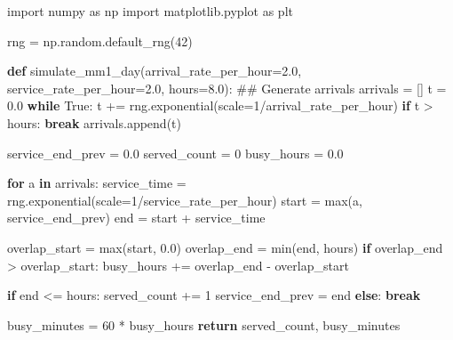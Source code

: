 \documentclass[
  letterpaper,
  DIV=11,
  numbers=noendperiod]{scrreprt}
\newenvironment{Shaded}{\begin{snugshade}}{\end{snugshade}}
\newcommand{\BuiltInTok}[1]{\textcolor[rgb]{0.00,0.23,0.31}{#1}}
\newcommand{\CommentTok}[1]{\textcolor[rgb]{0.37,0.37,0.37}{#1}}
\newcommand{\ControlFlowTok}[1]{\textcolor[rgb]{0.00,0.23,0.31}{\textbf{#1}}}
\newcommand{\DecValTok}[1]{\textcolor[rgb]{0.68,0.00,0.00}{#1}}
\newcommand{\FloatTok}[1]{\textcolor[rgb]{0.68,0.00,0.00}{#1}}
\newcommand{\ImportTok}[1]{\textcolor[rgb]{0.00,0.46,0.62}{#1}}
\newcommand{\KeywordTok}[1]{\textcolor[rgb]{0.00,0.23,0.31}{\textbf{#1}}}
\newcommand{\NormalTok}[1]{\textcolor[rgb]{0.00,0.23,0.31}{#1}}
\newcommand{\OperatorTok}[1]{\textcolor[rgb]{0.37,0.37,0.37}{#1}}
\newcommand{\VariableTok}[1]{\textcolor[rgb]{0.07,0.07,0.07}{#1}}
\begin{document}
\begin{Shaded}
\begin{Highlighting}[]
\ImportTok{import}\NormalTok{ numpy }\ImportTok{as}\NormalTok{ np}
\ImportTok{import}\NormalTok{ matplotlib.pyplot }\ImportTok{as}\NormalTok{ plt}

\NormalTok{rng }\OperatorTok{=}\NormalTok{ np.random.default\_rng(}\DecValTok{42}\NormalTok{)}

\KeywordTok{def}\NormalTok{ simulate\_mm1\_day(arrival\_rate\_per\_hour}\OperatorTok{=}\FloatTok{2.0}\NormalTok{, service\_rate\_per\_hour}\OperatorTok{=}\FloatTok{2.0}\NormalTok{, hours}\OperatorTok{=}\FloatTok{8.0}\NormalTok{):}
    \CommentTok{\#\# Generate arrivals}
\NormalTok{    arrivals }\OperatorTok{=}\NormalTok{ []}
\NormalTok{    t }\OperatorTok{=} \FloatTok{0.0}
    \ControlFlowTok{while} \VariableTok{True}\NormalTok{:}
\NormalTok{        t }\OperatorTok{+=}\NormalTok{ rng.exponential(scale}\OperatorTok{=}\DecValTok{1}\OperatorTok{/}\NormalTok{arrival\_rate\_per\_hour)}
        \ControlFlowTok{if}\NormalTok{ t }\OperatorTok{\textgreater{}}\NormalTok{ hours:}
            \ControlFlowTok{break}
\NormalTok{        arrivals.append(t)}

\NormalTok{    service\_end\_prev }\OperatorTok{=} \FloatTok{0.0}
\NormalTok{    served\_count }\OperatorTok{=} \DecValTok{0}
\NormalTok{    busy\_hours }\OperatorTok{=} \FloatTok{0.0}

    \ControlFlowTok{for}\NormalTok{ a }\KeywordTok{in}\NormalTok{ arrivals:}
\NormalTok{        service\_time }\OperatorTok{=}\NormalTok{ rng.exponential(scale}\OperatorTok{=}\DecValTok{1}\OperatorTok{/}\NormalTok{service\_rate\_per\_hour)}
\NormalTok{        start }\OperatorTok{=} \BuiltInTok{max}\NormalTok{(a, service\_end\_prev)}
\NormalTok{        end }\OperatorTok{=}\NormalTok{ start }\OperatorTok{+}\NormalTok{ service\_time}

\NormalTok{        overlap\_start }\OperatorTok{=} \BuiltInTok{max}\NormalTok{(start, }\FloatTok{0.0}\NormalTok{)}
\NormalTok{        overlap\_end }\OperatorTok{=} \BuiltInTok{min}\NormalTok{(end, hours)}
        \ControlFlowTok{if}\NormalTok{ overlap\_end }\OperatorTok{\textgreater{}}\NormalTok{ overlap\_start:}
\NormalTok{            busy\_hours }\OperatorTok{+=}\NormalTok{ overlap\_end }\OperatorTok{{-}}\NormalTok{ overlap\_start}

        \ControlFlowTok{if}\NormalTok{ end }\OperatorTok{\textless{}=}\NormalTok{ hours:}
\NormalTok{            served\_count }\OperatorTok{+=} \DecValTok{1}
\NormalTok{            service\_end\_prev }\OperatorTok{=}\NormalTok{ end}
        \ControlFlowTok{else}\NormalTok{:}
            \ControlFlowTok{break}

\NormalTok{    busy\_minutes }\OperatorTok{=} \DecValTok{60} \OperatorTok{*}\NormalTok{ busy\_hours}
    \ControlFlowTok{return}\NormalTok{ served\_count, busy\_minutes}
\end{Highlighting}
\end{Shaded}
\end{document}

